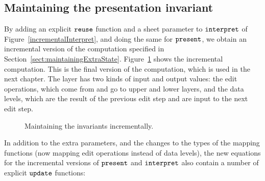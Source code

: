 %																
\subsection{Maintaining the presentation invariant} \label{sect:incrementalSpec}

By adding an explicit ${\tt reuse}$ function and a sheet parameter to ${\tt interpret}$ of Figure~\ref{incrementalInterpret}, and doing the same for ${\tt present}$, we obtain an incremental version of the computation specified in Section~\ref{sect:maintainingExtraState}. Figure~\ref{layerExtraStateInc} shows the incremental computation. This is the final version of the computation, which is used in the next chapter. The layer has two kinds of input and output values: the edit operations, which come from and go to upper and lower layers, and the data levels, which are the result of the previous edit step and are input to the next edit step.

\begin{figure}
\begin{center}
\begin{center}
\end{center}
\caption{Maintaining the invariants incrementally.}\label{layerExtraStateInc} 
\end{center}
\end{figure}

In addition to the extra parameters, and the changes to the types of the mapping functions (now mapping edit operations instead of data levels),  the new equations for the incremental versions of ${\tt present}$ and 
${\tt interpret}$ also contain a number of explicit  ${\tt update}$ functions: 


